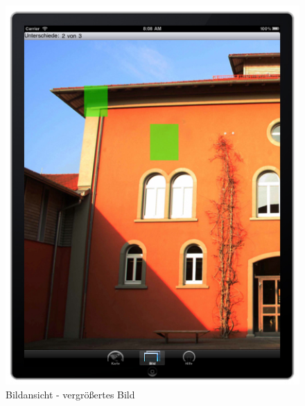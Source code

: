 \begin{figure}[H]
  \centering
  \includegraphics[width=1.0\textwidth]{bilder/screen3.jpg}
  \caption{Bildansicht - vergrößertes Bild}
  \label{imageviewscreen2}
\end{figure}

